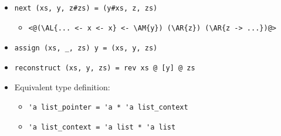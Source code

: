 \begin{frame}
\begin{itemize}
\item \lstinline.next (xs, y, z#zs) = (y#xs, z, zs).
\begin{itemize}
	\item
\begin{lstlisting}
<@(\AL{... <- x <- x} <- \AM{y}) (\AR{z}) (\AR{z -> ...})@>
\end{lstlisting}
\end{itemize}

\item \lstinline.assign (xs, _, zs) y = (xs, y, zs).

\item \lstinline.reconstruct (xs, y, zs) = rev xs @ [y] @ zs.

\item Equivalent type definition:
\begin{itemize}
	\item \lstinline.'a list_pointer = 'a * 'a list_context.
	\item \lstinline.'a list_context = 'a list * 'a list.
\end{itemize}
\end{itemize}
\end{frame}

